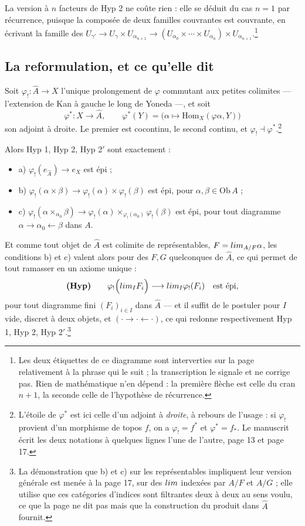 \documentclass[11pt,a4paper]{article}
\begin{document}
La version à $n$ facteurs de Hyp 2 ne coûte rien : elle se déduit du cas
$n = 1$ par récurrence, puisque la composée de deux familles couvrantes est
couvrante, en écrivant la famille des
$U_{\gamma'} \to U_{\gamma} \times U_{\alpha_{n+1}} \to
(U_{\alpha_{0}} \times \cdots \times U_{\alpha_{n}}) \times
U_{\alpha_{n+1}}$.\footnote{Les deux étiquettes de ce diagramme sont
interverties sur la page relativement à la phrase qui le suit ; la
transcription le signale et ne corrige pas. Rien de mathématique n'en dépend :
la première flèche est celle du cran $n+1$, la seconde celle de l'hypothèse de
récurrence.}

\subsection*{La reformulation, et ce qu'elle dit}

Soit $\varphi_{!} \colon \widehat{A} \to X$ l'unique prolongement de $\varphi$
commutant aux petites colimites — l'extension de Kan à gauche le long de
Yoneda —, et soit
\[
  \varphi^{*} \colon X \longrightarrow \widehat{A}, \qquad
  \varphi^{*}(Y) = \bigl(\alpha \mapsto \mathrm{Hom}_{X}(\varphi\alpha, Y)\bigr)
\]
son adjoint à droite. Le premier est cocontinu, le second continu, et
$\varphi_{!} \dashv \varphi^{*}$.\footnote{L'étoile de $\varphi^{*}$ est ici
celle d'un adjoint à \emph{droite}, à rebours de l'usage : si $\varphi_{!}$
provient d'un morphisme de topos $f$, on a $\varphi_{!} = f^{*}$ et
$\varphi^{*} = f_{*}$. Le manuscrit écrit les deux notations à quelques lignes
l'une de l'autre, page 13 et page 17.}

Alors Hyp 1, Hyp 2, Hyp 2${}'$ sont exactement :
\begin{itemize}
\item a) $\varphi_{!}(e_{\widehat{A}}) \to e_{X}$ est épi ;
\item b) $\varphi_{!}(\alpha\times\beta) \to \varphi_{!}(\alpha) \times
\varphi_{!}(\beta)$ est épi, pour $\alpha,\beta \in \mathrm{Ob}\,A$ ;
\item c) $\varphi_{!}(\alpha\times_{\alpha_{0}}\beta) \to \varphi_{!}(\alpha)
\times_{\varphi_{!}(\alpha_{0})} \varphi_{!}(\beta)$ est épi, pour tout
diagramme $\alpha \to \alpha_{0} \leftarrow \beta$ dans $A$.
\end{itemize}
Et comme tout objet de $\widehat{A}$ est colimite de représentables,
$F = \varinjlim_{A/F}\alpha$, les conditions b) et c) valent alors pour des
$F, G$ quelconques de $\widehat{A}$, ce qui permet de tout ramasser en un
axiome unique :
\[
  \textbf{(Hyp)} \qquad
  \varphi_{!}\Bigl(\varprojlim_{I} F_{i}\Bigr) \longrightarrow
  \varprojlim_{I} \varphi_{!}(F_{i}) \quad \text{est épi},
\]
pour tout diagramme fini $(F_{i})_{i \in I}$ dans $\widehat{A}$ — et il suffit
de le postuler pour $I$ vide, discret à deux objets, et
$({\cdot} \to {\cdot} \leftarrow {\cdot})$, ce qui redonne respectivement
Hyp 1, Hyp 2, Hyp 2${}'$.\footnote{La démonstration que b) et c) sur les
représentables impliquent leur version générale est menée à la page 17, sur des
$\varinjlim$ indexées par $A/F$ et $A/G$ ; elle utilise que ces catégories
d'indices sont filtrantes deux à deux au sens voulu, ce que la page ne dit pas
mais que la construction du produit dans $\widehat{A}$ fournit.}
\end{document}

